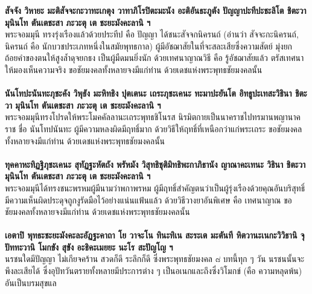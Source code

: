 \documentclass[12pt]{article}
\begin{document}
\textbf{สัจจัง วิหายะ มะติสัจจะกะวาทะเกตุง วาทาภิโรปิตะมะนัง อะติอันธะภูตัง ปัญญาปะทีปะชะลิโต ชิตะวา มุนินโท ตันเตชะสา ภะวะตุ เต ชะยะมังคะลานิ ฯ}\\
พระจอมมุนี ทรงรุ่งเรืองแล้วด้วยประทีป คือ ปัญญา ได้ชนะสัจจกนิครนถ์ (อ่านว่า สัจจะกะนิครนถ์, นิครนถ์ คือ นักบวชประเภทหนึ่งในสมัยพุทธกาล) ผู้มีอัชฌาสัยในที่จะสละเสียซึ่งความสัตย์ มุ่งยกถ้อยคำของตนให้สูงล้ำดุจยกธง เป็นผู้มืดมนยิ่งนัก ด้วยเทศนาญาณวิธี คือ รู้อัชฌาสัยแล้ว ตรัสเทศนาให้มองเห็นความจริง ขอชัยมงคลทั้งหลายจงมีแก่ท่าน ด้วยเดชแห่งพระพุทธชัยมงคลนั้น\\\\
\textbf{นันโทปะนันทะภุชะคัง วิพุธัง มะหิทธิง ปุตเตนะ เถระภุชะเคนะ ทะมาปะยันโต อิทธูปะเทสะวิธินา ชิตะวา มุนินโท ตันเตชะสา ภะวะตุ เต ชะยะมังคะลานิ ฯ}\\
พระจอมมุนีทรงโปรดให้พระโมคคัลลานะเถระพุทธชิโนรส นิรมิตกายเป็นนาคราชไปทรมานพญานาคราช ชื่อ นันโทปนันทะ ผู้มีความหลงผิดมีฤทธิ์มาก ด้วยวิธีให้ฤทธิ์ที่เหนือกว่าแก่พระเถระ ขอชัยมงคลทั้งหลายจงมีแก่ท่าน ด้วยเดชแห่งพระพุทธชัยมงคลนั้น\\\\
\textbf{ทุคคาหะทิฏฐิภุชะเคนะ สุทัฏฐะหัตถัง พรัหมัง วิสุทธิชุติมิทธิพะกาภิธานัง ญาณาคะเทนะ วิธินา ชิตะวา มุนินโท ตันเตชะสา ภะวะตุ เต ชะยะมังคะลานิ ฯ}\\
พระจอมมุนีได้ทรงชนะพรหมผู้มีนามว่าพกาพรหม ผู้มีฤทธิ์สำคัญตนว่าเป็นผู้รุ่งเรืองด้วยคุณอันบริสุทธิ์ มีความเห็นผิดประดุจถูกงูรัดมือไว้อย่างแน่นแฟ้นแล้ว ด้วยวิธีวางยาอันพิเศษ คือ เทศนาญาณ ขอชัยมงคลทั้งหลายจงมีแก่ท่าน ด้วยเดชแห่งพระพุทธชัยมงคลนั้น\\\\
\textbf{เอตาปิ พุทธะชะยะมังคะละอัฏฐะคาถา โย วาจะโน ทินะทิเน สะระเต มะตันที หิตวานะเนกะวิวิธานิ จุปัททะวานิ โมกขัง สุขัง อะธิคะเมยยะ นะโร สะปัญโญ ฯ}\\
นรชนใดมีปัญญา ไม่เกียจคร้าน สวดก็ดี ระลึกก็ดี ซึ่งพระพุทธชัยมงคล ๘ บทนี้ทุก ๆ วัน นรชนนั้นจะพึงละเสียได้ ซึ่งอุปัทวันตรายทั้งหลายมีประการต่าง ๆ เป็นอเนกและถึงซึ่งวิโมกข์ (คือ ความหลุดพ้น) อันเป็นบรมสุขแล
\end{document}
